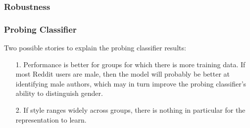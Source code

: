 \subsubsection{Robustness}

\subsubsection{Probing Classifier}
Two possible stories to explain the probing classifier results:
\begin{itemize}
    \item[1.] Performance is better for groups for which there is more training data. If most Reddit users are male, then the model will probably be better at identifying male authors, which may in turn improve the probing classifier's ability to distinguish gender.
    \item[2.] If style ranges widely across groups, there is nothing in particular for the representation to learn.
\end{itemize}

